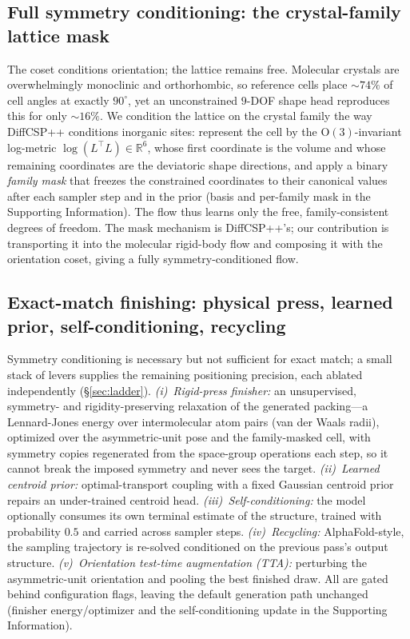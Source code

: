 \documentclass[journal=jcisd8,manuscript=article]{achemso}
\begin{document}
\subsection{Full symmetry conditioning: the crystal-family lattice mask}
\label{sec:family}
The coset conditions orientation; the lattice remains free. Molecular crystals are
overwhelmingly monoclinic and orthorhombic, so reference cells place $\sim\!74\%$
of cell angles at exactly $90^\circ$, yet an unconstrained $9$-DOF shape head
reproduces this for only $\sim\!16\%$. We condition the lattice on the crystal
family the way DiffCSP++\cite{jiao2024diffcsppp} conditions inorganic sites:
represent the cell by the $\mathrm{O}(3)$-invariant log-metric
$\log(L^\top L)\in\mathbb{R}^6$, whose first coordinate is the volume and whose
remaining coordinates are the deviatoric shape directions, and apply a binary
\emph{family mask} that freezes the constrained coordinates to their canonical
values after each sampler step and in the prior (basis and per-family mask in the
Supporting Information). The flow thus learns only the free, family-consistent
degrees of freedom. The mask mechanism is DiffCSP++'s; our contribution is
transporting it into the molecular rigid-body flow and composing it with the
orientation coset, giving a fully symmetry-conditioned flow.

\subsection{Exact-match finishing: physical press, learned prior, self-conditioning,
recycling}\label{sec:finish}
Symmetry conditioning is necessary but not sufficient for exact match; a small
stack of levers supplies the remaining positioning precision, each ablated
independently (\S\ref{sec:ladder}). \emph{(i)~Rigid-press finisher:} an
unsupervised, symmetry- and rigidity-preserving relaxation of the generated
packing---a Lennard-Jones energy over intermolecular atom pairs (van der Waals
radii), optimized over the asymmetric-unit pose and the family-masked cell, with
symmetry copies regenerated from the space-group operations each step, so it cannot
break the imposed symmetry and never sees the target. \emph{(ii)~Learned centroid
prior:} optimal-transport coupling\cite{pooladian2023multisample} with a fixed
Gaussian centroid prior repairs an under-trained centroid head.
\emph{(iii)~Self-conditioning:} the model optionally consumes its own terminal
estimate of the structure, trained with probability $0.5$ and carried across
sampler steps. \emph{(iv)~Recycling:} AlphaFold-style, the sampling trajectory is
re-solved conditioned on the previous pass's output structure.
\emph{(v)~Orientation test-time augmentation (TTA):} perturbing the
asymmetric-unit orientation and pooling the best finished draw. All are gated
behind configuration flags, leaving the default generation path unchanged (finisher
energy/optimizer and the self-conditioning update in the Supporting Information).
\end{document}
